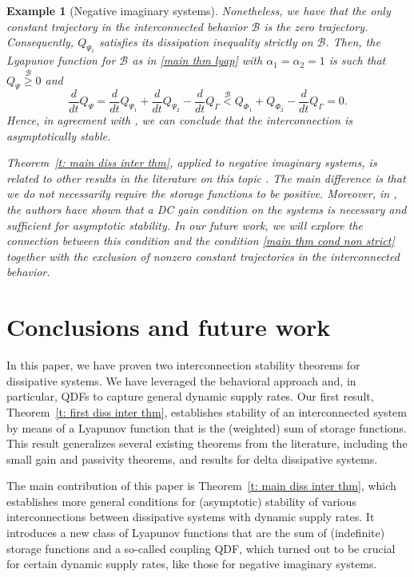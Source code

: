 \documentclass[letterpaper, 10 pt, conference]{ieeeconf}
\theoremstyle{ieeeconf}
\newtheorem{example}{Example}
\newcommand{\B}{\mathcal{B}}
\begin{document}
\begin{example}[Negative imaginary systems]
	Nonetheless, we have that the only constant trajectory in the interconnected behavior $\B$ is the zero trajectory. 
	Consequently, $Q_{\Psi_1}$ satisfies its dissipation inequality strictly on $\B$.
	Then, the Lyapunov function for $\B$ as in \eqref{main thm lyap} with ${\alpha_1=\alpha_2=1}$ is such that $Q_\Psi \stackrel{\B}{\geq}0$ and 
	\[\frac{d}{dt}Q_\Psi =\frac{d}{dt}Q_{\Psi_1}+\frac{d}{dt}Q_{\Psi_2}-\frac{d}{dt}Q_\Gamma \stackrel{\B}{<}Q_{\Phi_1}+Q_{\Phi_2}  -\frac{d}{dt}Q_\Gamma =0. \]
	Hence, in agreement with \cite{petersen_negative_2016}, we can conclude that the interconnection is asymptotically stable. 
	
	Theorem~\ref{t: main diss inter thm}, applied to negative imaginary systems, is related to other results in the literature on this topic \cite{xiong_negative_2010,meskin_generalized_2024}. The main difference is that we do not necessarily require the storage functions to be positive. Moreover, in \cite[Theorem~1]{xiong_negative_2010}, the authors have shown that a DC gain condition on the systems is necessary and sufficient for asymptotic stability.  In our future work, we will explore the connection between this condition and the condition \eqref{main thm cond non strict} together with the exclusion of nonzero constant trajectories in the interconnected behavior.
\end{example}

\section{Conclusions and future work}
\label{sec:conclusion}
In this paper, we have proven two interconnection stability theorems for dissipative systems. We have leveraged the behavioral approach and, in particular, QDFs to capture general dynamic supply rates. Our first result, Theorem~\ref{t: first diss inter thm}, establishes stability of an interconnected system by means of a Lyapunov function that is the (weighted) sum of storage functions. This result generalizes several existing theorems from the literature, including the small gain and passivity theorems, and results for delta dissipative systems.

The main contribution of this paper is Theorem~\ref{t: main diss inter thm}, which establishes more general conditions for (asymptotic) stability of various interconnections between dissipative systems with dynamic supply rates. It introduces a new class of Lyapunov functions that are the sum of (indefinite) storage functions and a so-called coupling QDF, which turned out to be crucial for certain dynamic supply rates, like those for negative imaginary systems. %
\end{document}
